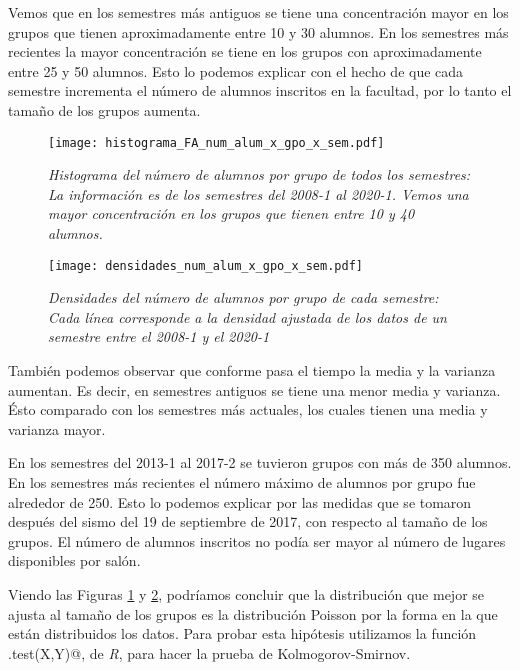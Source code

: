 Vemos que en los semestres más antiguos se tiene una concentración mayor en los grupos que tienen aproximadamente entre 10 y 30 alumnos. En los semestres más recientes la mayor concentración se tiene en los grupos con aproximadamente entre 25 y 50 alumnos. Esto lo podemos explicar con el hecho de que cada semestre incrementa el número de alumnos inscritos en la facultad, por lo tanto el tamaño de los grupos aumenta.

\begin{figure}[H]
\centering
\texttt{[image: histograma\_FA\_num\_alum\_x\_gpo\_x\_sem.pdf]} %
\caption[\textit{Histograma del número de alumnos por grupo de todos los semestres}]{\textit{Histograma del número de alumnos por grupo de todos los semestres: La información es de los semestres del 2008-1 al 2020-1. Vemos una mayor concentración en los grupos que tienen entre 10 y 40 alumnos.}}\label{histNumAl_x_gpo_x_sem}
\end{figure}

\begin{figure}[H]
\centering
\texttt{[image: densidades\_num\_alum\_x\_gpo\_x\_sem.pdf]} %
\caption[\textit{Densidades del número de alumnos por grupo de cada semestre}]{\textit{Densidades del número de alumnos por grupo de cada semestre: Cada línea corresponde a la densidad ajustada de los datos de un semestre entre el 2008-1 y el 2020-1}}\label{densidadesNumAl_x_gpo_x_sem}
\end{figure}

También podemos observar que conforme pasa el tiempo la media y la varianza aumentan. Es decir, en semestres antiguos se tiene una menor media y varianza. Ésto comparado con los semestres más actuales, los cuales tienen una media y varianza mayor.

En los semestres del 2013-1 al 2017-2 se tuvieron grupos con más de 350 alumnos. En los semestres más recientes el número máximo de alumnos por grupo fue alrededor de 250. Esto lo podemos explicar por las medidas que se tomaron después del sismo del 19 de septiembre de 2017, con respecto al tamaño de los grupos. El número de alumnos inscritos no podía ser mayor al número de lugares disponibles por salón.

Viendo las Figuras \ref{histNumAl_x_gpo_x_sem} y \ref{densidadesNumAl_x_gpo_x_sem}, podríamos concluir que la distribución que mejor se ajusta al tamaño de los grupos es la distribución Poisson por la forma en la que están distribuidos los datos. Para probar esta hipótesis utilizamos la función \verb@ks.test(X,Y)@, de \textit{R}, para hacer la prueba de Kolmogorov-Smirnov.

